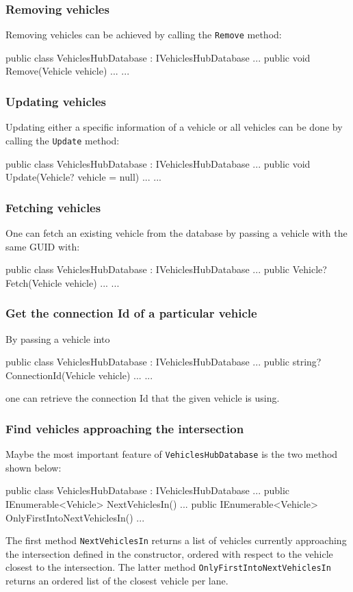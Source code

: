 \subsubsection{Removing vehicles}
Removing vehicles can be achieved by calling the \verb|Remove| method:
\begin{csharp}
public class VehiclesHubDatabase : IVehiclesHubDatabase
{
	...
	public void Remove(Vehicle vehicle) {...}
	...
}
\end{csharp}

\subsubsection{Updating vehicles}
Updating either a specific information of a vehicle or all vehicles can be done by calling the \verb|Update| method:
\begin{csharp}
public class VehiclesHubDatabase : IVehiclesHubDatabase
{
	...
	public void Update(Vehicle? vehicle = null) {...}
	...
}
\end{csharp}

\subsubsection{Fetching vehicles}
One can fetch an existing vehicle from the database by passing a vehicle with the same GUID with:
\begin{csharp}
public class VehiclesHubDatabase : IVehiclesHubDatabase
{
	...
	public Vehicle? Fetch(Vehicle vehicle) {...}
	...
}
\end{csharp}

\subsubsection{Get the connection Id of a particular vehicle}
By passing a vehicle into
\begin{csharp}
public class VehiclesHubDatabase : IVehiclesHubDatabase
{
	...
	public string? ConnectionId(Vehicle vehicle) {...}
	...
}
\end{csharp}
one can retrieve the connection Id that the given vehicle is using.

\subsubsection{Find vehicles approaching the intersection}
Maybe the most important feature of \verb|VehiclesHubDatabase| is the two method shown below:
\begin{csharp}
public class VehiclesHubDatabase : IVehiclesHubDatabase
{
	...
	public IEnumerable<Vehicle> NextVehiclesIn() {...}
	public IEnumerable<Vehicle> OnlyFirstIntoNextVehiclesIn() {...}
}
\end{csharp}
The first method \verb|NextVehiclesIn| returns a list of vehicles currently approaching the intersection defined in the constructor, ordered with respect to the vehicle closest to the intersection. The latter method \verb|OnlyFirstIntoNextVehiclesIn| returns an ordered list of the closest vehicle per lane.